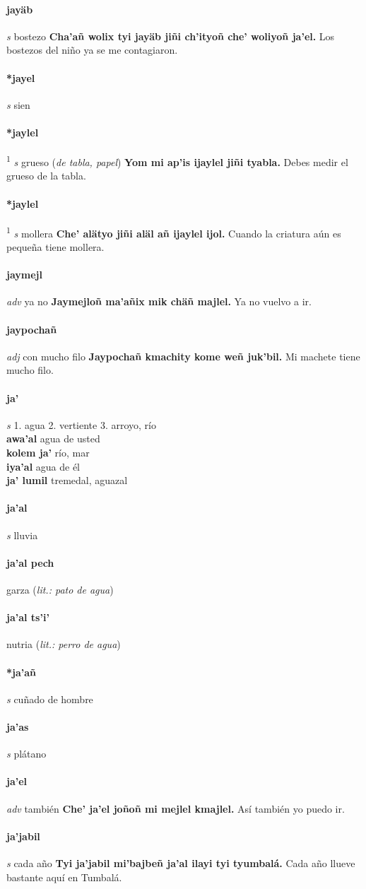 \documentclass{scrbook}
\newcommand{\entry}[1]{\paragraph{#1}}
\newcommand{\onedefinition}[1]{#1.}
\newcommand{\defsuperscript}[1]{\textsuperscript{1}}
\newcommand{\partofspeech}[1]{\textit{#1}}
\newcommand{\spanishtranslation}[1]{#1}
\newcommand{\clarification}[1]{(\textit{#1})}
\newcommand{\cholexample}[1]{\textbf{#1}}
\newcommand{\exampletranslation}[1]{#1}
\newcommand{\secondaryentry}[1]{\\\textbf{#1}}
\newcommand{\secondtranslation}[1]{#1}
\begin{document}
\begin{multicols}{2}
\entry{jayäb}
\partofspeech{s}
\spanishtranslation{bostezo}
\cholexample{Cha'añ wolix tyi jayäb jiñi ch'ityoñ che' woliyoñ ja'el.}
\exampletranslation{Los bostezos del niño ya se me contagiaron.}

\entry{*jayel}
\partofspeech{s}
\spanishtranslation{sien}

\entry{*jaylel}
\defsuperscript{1}
\partofspeech{s}
\spanishtranslation{grueso}
\clarification{de tabla, papel}
\cholexample{Yom mi ap'is ijaylel jiñi tyabla.}
\exampletranslation{Debes medir el grueso de la tabla.}

\entry{*jaylel}
\defsuperscript{2}
\partofspeech{s}
\spanishtranslation{mollera}
\cholexample{Che' alätyo jiñi aläl añ ijaylel ijol.}
\exampletranslation{Cuando la criatura aún es pequeña tiene mollera.}

\entry{jaymejl}
\partofspeech{adv}
\spanishtranslation{ya no}
\cholexample{Jaymejloñ ma'añix mik chäñ majlel.}
\exampletranslation{Ya no vuelvo a ir.}

\entry{jaypochañ}
\partofspeech{adj}
\spanishtranslation{con mucho filo}
\cholexample{Jaypochañ kmachity kome weñ juk'bil.}
\exampletranslation{Mi machete tiene mucho filo.}

\entry{ja'}
\partofspeech{s}
\onedefinition{1}
\spanishtranslation{agua}
\onedefinition{2}
\spanishtranslation{vertiente}
\onedefinition{3}
\spanishtranslation{arroyo, río}
\secondaryentry{awa'al}
\secondtranslation{agua de usted}
\secondaryentry{kolem ja'}
\secondtranslation{río, mar}
\secondaryentry{iya'al}
\secondtranslation{agua de él}
\secondaryentry{ja' lumil}
\secondtranslation{tremedal, aguazal}

\entry{ja'al}
\partofspeech{s}
\spanishtranslation{lluvia}

\entry{ja'al pech}
\spanishtranslation{garza}
\clarification{lit.: pato de agua}

\entry{ja'al ts'i'}
\spanishtranslation{nutria}
\clarification{lit.: perro de agua}

\entry{*ja'añ}
\partofspeech{s}
\spanishtranslation{cuñado de hombre}

\entry{ja'as}
\partofspeech{s}
\spanishtranslation{plátano}

\entry{ja'el}
\partofspeech{adv}
\spanishtranslation{también}
\cholexample{Che' ja'el joñoñ mi mejlel kmajlel.}
\exampletranslation{Así también yo puedo ir.}

\entry{ja'jabil}
\partofspeech{s}
\spanishtranslation{cada año}
\cholexample{Tyi ja'jabil mi'bajbeñ ja'al ilayi tyi tyumbalá.}
\exampletranslation{Cada año llueve bastante aquí en Tumbalá.}


\end{multicols}
\end{document}
